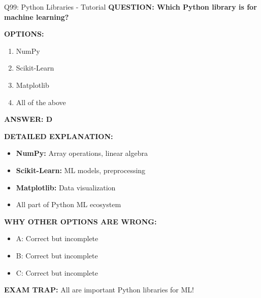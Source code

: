 \documentclass[8pt]{beamer}
\begin{document}
	\begin{frame}{Q99: Python Libraries - Tutorial}
		\fontsize{6.5}{7.5}\selectfont
		\textbf{QUESTION: Which Python library is for machine learning?}
		
		\vspace{0.1cm}
		\textbf{OPTIONS:}
		\begin{enumerate}
			\item NumPy
			\item Scikit-Learn
			\item Matplotlib
			\item All of the above
		\end{enumerate}
		
		\vspace{0.1cm}
		\textcolor{myblue}{\textbf{ANSWER: D}}
		
		\vspace{0.1cm}
		\textbf{DETAILED EXPLANATION:}
		\begin{itemize}
			\item \textbf{NumPy:} Array operations, linear algebra
			\item \textbf{Scikit-Learn:} ML models, preprocessing
			\item \textbf{Matplotlib:} Data visualization
			\item All part of Python ML ecosystem
		\end{itemize}
		
		\vspace{0.1cm}
		\textcolor{myred}{\textbf{WHY OTHER OPTIONS ARE WRONG:}}
		\begin{itemize}
			\item \textcolor{myred}{A:} Correct but incomplete
			\item \textcolor{myred}{B:} Correct but incomplete
			\item \textcolor{myred}{C:} Correct but incomplete
		\end{itemize}
		
		\textcolor{myred}{\textbf{EXAM TRAP:}} All are \textcolor{myblue}{important Python libraries} for ML!
	\end{frame}
	
\end{document}
